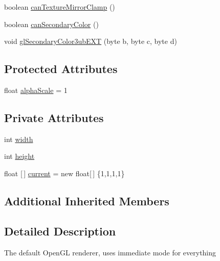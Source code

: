 \begin{DoxyCompactItemize}
\item 
boolean \mbox{\hyperlink{classorg_1_1newdawn_1_1slick_1_1opengl_1_1renderer_1_1_immediate_mode_o_g_l_renderer_a0a78539a89f48cbb6a135a3623696cbb}{can\+Texture\+Mirror\+Clamp}} ()
\item 
boolean \mbox{\hyperlink{classorg_1_1newdawn_1_1slick_1_1opengl_1_1renderer_1_1_immediate_mode_o_g_l_renderer_abf83acb7f158b204c44af119d782719d}{can\+Secondary\+Color}} ()
\item 
void \mbox{\hyperlink{classorg_1_1newdawn_1_1slick_1_1opengl_1_1renderer_1_1_immediate_mode_o_g_l_renderer_a84d95cf18d125c1cc9c0ddc6d3ce925d}{gl\+Secondary\+Color3ub\+E\+XT}} (byte b, byte c, byte d)
\end{DoxyCompactItemize}
\subsection*{Protected Attributes}
\begin{DoxyCompactItemize}
\item 
float \mbox{\hyperlink{classorg_1_1newdawn_1_1slick_1_1opengl_1_1renderer_1_1_immediate_mode_o_g_l_renderer_aa1772629fe3d1481ba6b0688fedcfb23}{alpha\+Scale}} = 1
\end{DoxyCompactItemize}
\subsection*{Private Attributes}
\begin{DoxyCompactItemize}
\item 
int \mbox{\hyperlink{classorg_1_1newdawn_1_1slick_1_1opengl_1_1renderer_1_1_immediate_mode_o_g_l_renderer_a65d0a04d747368ea954f69074d9102d6}{width}}
\item 
int \mbox{\hyperlink{classorg_1_1newdawn_1_1slick_1_1opengl_1_1renderer_1_1_immediate_mode_o_g_l_renderer_aec68994a0ee3b7b478122af823c8a8d7}{height}}
\item 
float \mbox{[}$\,$\mbox{]} \mbox{\hyperlink{classorg_1_1newdawn_1_1slick_1_1opengl_1_1renderer_1_1_immediate_mode_o_g_l_renderer_a0b726a5c9cde29fd7cff75d8d18af74b}{current}} = new float\mbox{[}$\,$\mbox{]} \{1,1,1,1\}
\end{DoxyCompactItemize}
\subsection*{Additional Inherited Members}


\subsection{Detailed Description}
The default Open\+GL renderer, uses immediate mode for everything

